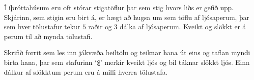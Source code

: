 \begin{problem}
	Í íþróttahúsum eru oft stórar stigatöflur þar sem stig hvors liðs er gefið upp.
	Skjárinn, sem stigin eru birt á, er hægt að hugsa um sem töflu af ljósaperum, þar sem hver tölustafur tekur $5$ raðir og $3$ dálka af ljósaperum.
	Kveikt og slökkt er á perum til að mynda tölustafi.

	Skrifið forrit sem les inn jákvæða heiltölu og teiknar hana út eins og taflan myndi birta hana, þar sem stafurinn `\texttt{@}' merkir kveikt ljós og bil táknar slökkt ljós.
	Einn dálkur af slökktum perum eru á milli hverra tölustafa.

\begin{example}
%
\end{example}
\begin{example}
%
\end{example}
\end{problem}